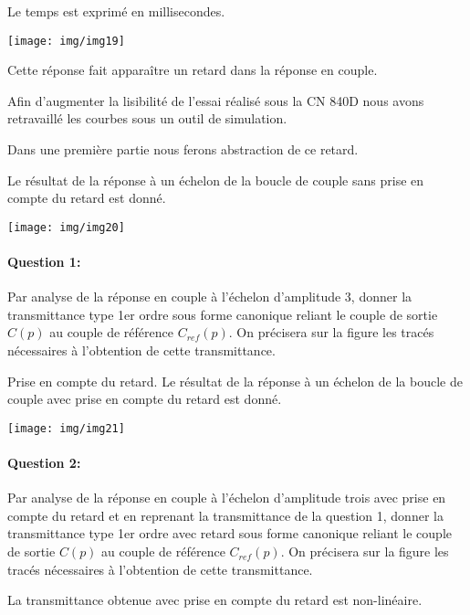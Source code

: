 Le temps est exprimé en millisecondes.

\begin{center}
 \texttt{[image: img/img19]}
\end{center}

Cette réponse fait apparaître un retard dans la réponse en couple.

Afin d'augmenter la lisibilité de l'essai réalisé sous la CN 840D nous avons retravaillé les courbes sous un outil de simulation.

Dans une première partie nous ferons abstraction de ce retard.

Le résultat de la réponse à un échelon de la boucle de couple sans prise en compte du retard est donné.

\begin{center}
 \texttt{[image: img/img20]}
\end{center}

\paragraph{Question 1:} Par analyse de la réponse en couple à l'échelon d'amplitude 3, donner la transmittance type 1er ordre sous forme canonique reliant le couple de sortie $C(p)$ au couple de référence $C_{ref}(p)$. On précisera sur la figure les tracés nécessaires à l'obtention de cette transmittance.

Prise en compte du retard. Le résultat de la réponse à un échelon de la boucle de couple avec prise en compte du retard est donné.

\begin{center}
 \texttt{[image: img/img21]}
\end{center}

\paragraph{Question 2:} Par analyse de la réponse en couple à l'échelon d'amplitude trois avec prise en compte du retard et en reprenant la transmittance de la question 1, donner la transmittance type 1er ordre avec retard sous forme canonique reliant le couple de sortie $C(p)$ au couple de référence $C_{ref}(p)$. On précisera sur la figure les tracés nécessaires à l'obtention de cette transmittance.

La transmittance obtenue avec prise en compte du retard est non-linéaire.

